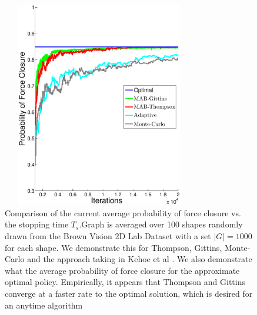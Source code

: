 \documentclass[a4paper, 10pt, conference]{ieeeconf}      %
\begin{document}
\begin{figure}[ht!]
\centering
\includegraphics[width = 8.5cm, height = 9cm]{matlab_figures/pfc.eps}
\caption{ \footnotesize Comparison of the current average probability of force closure vs. the stopping time $T_s$.Graph is averaged over 100 shapes randomly drawn from the Brown Vision 2D Lab Dataset \cite{brown} with a set $|G|=1000$ for each shape.  We demonstrate this for Thompson, Gittins, Monte-Carlo and the approach taking in Kehoe et al \cite{kehoe2012toward}. We also demonstrate what the average probability of force closure for the approximate optimal policy. Empirically, it appears that Thompson and Gittins converge at a faster rate to the optimal solution, which is desired for an anytime algorithm  }
\vspace*{-10pt}
\label{fig:grasp_quality}
\end{figure}
\end{document}

